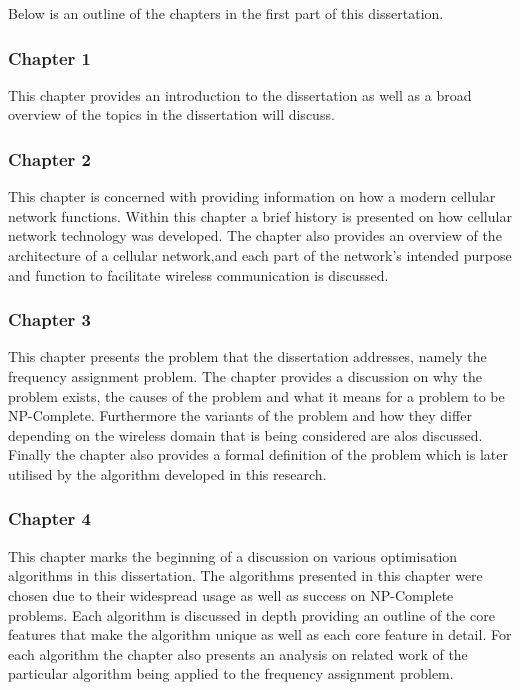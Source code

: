 Below is an outline of the chapters in the first part of this dissertation.
\subsubsection{Chapter 1}
This chapter provides an introduction to the dissertation as well as a broad overview of the topics in the dissertation will discuss.
\subsubsection{Chapter 2}
This chapter is concerned with providing information on how a modern cellular network functions. Within this chapter a brief history is presented on how cellular network technology was developed. The chapter also provides an overview of the architecture of a cellular network,and each part of the network's intended purpose and function to facilitate wireless communication is discussed.
\subsubsection{Chapter 3}
This chapter presents the problem that the dissertation addresses, namely the frequency assignment problem. The chapter provides a discussion on why the problem exists, the causes of the problem and what it means for a problem to be NP-Complete. Furthermore the variants of the problem and how they differ depending on the wireless domain that is being considered are alos discussed. Finally the chapter also provides a formal definition of the problem which is later utilised by the algorithm developed in this research.
\subsubsection{Chapter 4}
This chapter marks the beginning of a discussion on various optimisation algorithms in this dissertation. The algorithms presented in this chapter were chosen due to their widespread usage as well as success on NP-Complete problems. Each algorithm is discussed in depth providing an outline of the core features that make the algorithm unique as well as each core feature in detail. For each algorithm the chapter also presents an analysis on related work of the particular algorithm being applied to the frequency assignment problem. 
